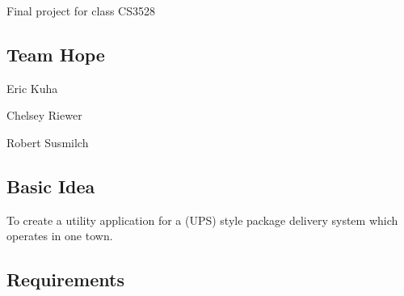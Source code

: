 Final project for class C\+S3528 \subsection*{Team Hope}


\begin{DoxyItemize}
\item Eric Kuha
\item Chelsey Riewer
\item Robert Susmilch
\end{DoxyItemize}

\subsection*{Basic Idea}

To create a utility application for a (U\+PS) style package delivery system which operates in one town.

\subsection*{Requirements}


